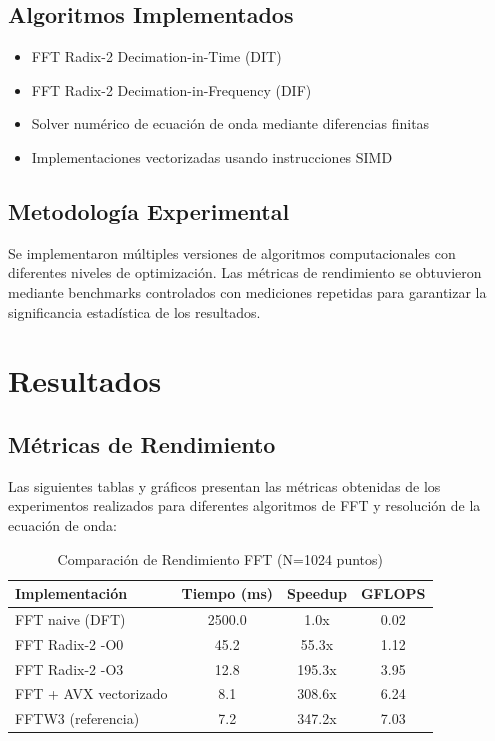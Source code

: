 \documentclass[a4paper]{article}
\begin{document}
\subsection{Algoritmos Implementados}
\begin{itemize}
\item FFT Radix-2 Decimation-in-Time (DIT)
\item FFT Radix-2 Decimation-in-Frequency (DIF)
\item Solver numérico de ecuación de onda mediante diferencias finitas
\item Implementaciones vectorizadas usando instrucciones SIMD
\end{itemize}

\subsection{Metodología Experimental}
Se implementaron múltiples versiones de algoritmos computacionales con diferentes niveles de optimización. Las métricas de rendimiento se obtuvieron mediante benchmarks controlados con mediciones repetidas para garantizar la significancia estadística de los resultados.

\section{Resultados}

\subsection{Métricas de Rendimiento}

Las siguientes tablas y gráficos presentan las métricas obtenidas de los experimentos realizados para diferentes algoritmos de FFT y resolución de la ecuación de onda:

\begin{table}[h]
\centering
\caption{Comparación de Rendimiento FFT (N=1024 puntos)}
\begin{tabular}{@{}lccc@{}}
\toprule
Implementación & Tiempo (ms) & Speedup & GFLOPS \\
\midrule
FFT naive (DFT) & 2500.0 & 1.0x & 0.02 \\
FFT Radix-2 -O0 & 45.2 & 55.3x & 1.12 \\
FFT Radix-2 -O3 & 12.8 & 195.3x & 3.95 \\
FFT + AVX vectorizado & 8.1 & 308.6x & 6.24 \\
FFTW3 (referencia) & 7.2 & 347.2x & 7.03 \\
\bottomrule
\end{tabular}
\label{tab:fft_performance}
\end{table}
\end{document}
